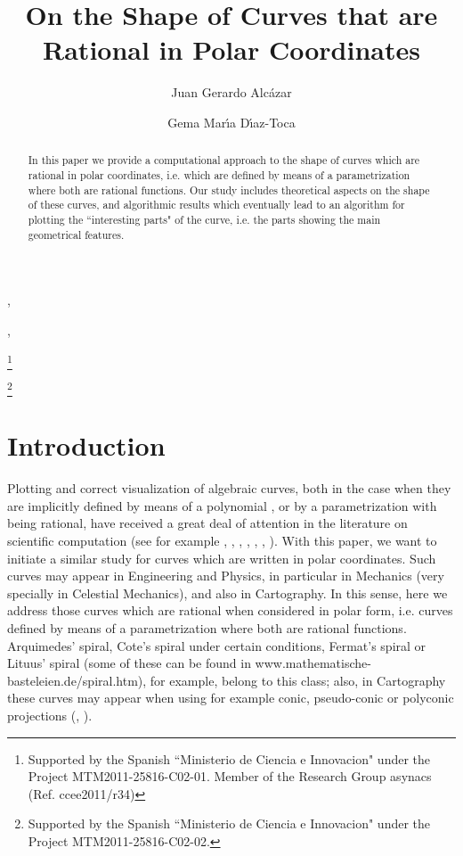 \documentclass{elsart}
\begin{document}
\begin{frontmatter}






\title{On the Shape of Curves that are Rational in Polar Coordinates}



\author[a]{Juan Gerardo Alc\'azar},
\author[b]{Gema Mar\'{\i}a D\'{\i}az-Toca},




\address[a]{Departamento de Matem\'aticas, Universidad de Alcal\'a,
E-28871 Madrid, Spain}
\address[b]{Departamento de Matem\'atica Aplicada, Universidad de
Murcia,  30100 Murcia, Spain}




\thanks[proy1]{Supported by the Spanish ``Ministerio de
Ciencia e Innovacion" under the Project MTM2011-25816-C02-01. Member of the Research Group {\sc asynacs} (Ref. {\sc ccee2011/r34})}

\thanks[proy2]{Supported by the Spanish ``Ministerio de
Ciencia e Innovacion" under the Project MTM2011-25816-C02-02.}



\begin{abstract}
In this paper we provide a computational approach to the shape
of curves which are rational in polar coordinates, i.e. which are defined by means of a parametrization
 where both  are rational functions. Our study includes theoretical aspects on the shape of these curves, and algorithmic results which eventually lead to an algorithm for plotting the ``interesting parts" of the curve, i.e. the parts showing the main geometrical features.
\end{abstract}
\end{frontmatter}

\section{Introduction}\label{section-introduction}

Plotting and correct visualization of algebraic curves, both in the case when they are implicitly defined by means of a polynomial , or by a parametrization  with  being rational, have received a great deal of attention in the literature on scientific computation (see for example \cite{JGDT}, \cite{Cheng}, \cite{Eigen}, \cite{Emel}, \cite{Lalo}, \cite{Hong}, \cite{seidel}). With this paper, we want to initiate a similar study for curves which are written in polar coordinates. Such curves may appear in Engineering and Physics, in particular in Mechanics (very specially in Celestial Mechanics), and also in Cartography. In this sense, here we address those curves which are rational when considered in polar form, i.e. curves defined by means of a parametrization  where both  are rational functions. Arquimedes' spiral, Cote's spiral under certain conditions, Fermat's spiral or Lituus' spiral (some of these can be found in www.mathematische-basteleien.de/spiral.htm), for example, belong to this class; also, in Cartography these curves may appear when using for example conic, pseudo-conic or polyconic projections (\cite{Buga}, \cite{Sny}).
\end{document}
